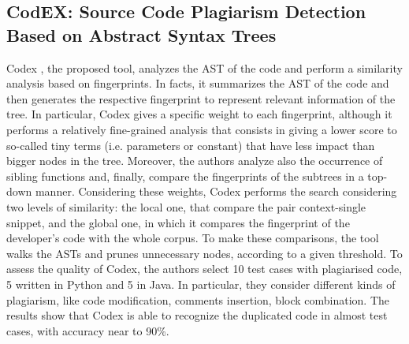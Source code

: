 \subsection{CodEX: Source Code Plagiarism Detection Based on Abstract Syntax Trees}
Codex \cite{DBLP:conf/aics/ZhengPL18}, the proposed tool, analyzes the AST of the code and perform a similarity analysis based on fingerprints. In facts, it summarizes the AST of the code and then generates the respective fingerprint to represent relevant information of the tree. In particular, Codex gives a specific weight to each fingerprint, although it performs a relatively fine-grained analysis that consists in giving a lower score to so-called tiny terms (i.e. parameters or constant) that have less impact than bigger nodes in the tree. Moreover, the authors analyze also the occurrence of sibling functions and, finally, compare the fingerprints of the subtrees in a top-down manner. Considering these weights, Codex performs the search considering two levels of similarity: the local one, that compare the pair context-single snippet, and the global one, in which it compares the fingerprint of the developer's code with the whole corpus. To make these comparisons, the tool walks the ASTs and prunes unnecessary nodes, according to a given threshold. To assess the quality of Codex, the authors select 10 test cases with plagiarised code, 5 written in Python and 5 in Java. In particular, they consider different kinds of plagiarism, like code modification, comments insertion, block combination. The results show that Codex is able to recognize the duplicated code in almost test cases, with accuracy near to 90\%.

